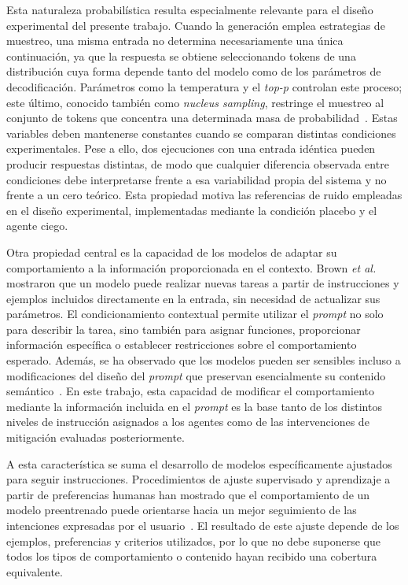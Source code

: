 Esta naturaleza probabilística resulta especialmente relevante para el diseño experimental del presente trabajo. Cuando la generación emplea estrategias de muestreo, una misma entrada no determina necesariamente una única continuación, ya que la respuesta se obtiene seleccionando tokens de una distribución cuya forma depende tanto del modelo como de los parámetros de decodificación. Parámetros como la temperatura y el \textit{top-p} controlan este proceso; este último, conocido también como \textit{nucleus sampling}, restringe el muestreo al conjunto de tokens que concentra una determinada masa de probabilidad~\cite{holtzman2019curious}. Estas variables deben mantenerse constantes cuando se comparan distintas condiciones experimentales. Pese a ello, dos ejecuciones con una entrada idéntica pueden producir respuestas distintas, de modo que cualquier diferencia observada entre condiciones debe interpretarse frente a esa variabilidad propia del sistema y no frente a un cero teórico. Esta propiedad motiva las referencias de ruido empleadas en el diseño experimental, implementadas mediante la condición placebo y el agente ciego.

Otra propiedad central es la capacidad de los modelos de adaptar su comportamiento a la información proporcionada en el contexto. Brown \textit{et al.}~\cite{brown2020language} mostraron que un modelo puede realizar nuevas tareas a partir de instrucciones y ejemplos incluidos directamente en la entrada, sin necesidad de actualizar sus parámetros. El condicionamiento contextual permite utilizar el \textit{prompt} no solo para describir la tarea, sino también para asignar funciones, proporcionar información específica o establecer restricciones sobre el comportamiento esperado. Además, se ha observado que los modelos pueden ser sensibles incluso a modificaciones del diseño del \textit{prompt} que preservan esencialmente su contenido semántico~\cite{sclar2024quantifying}. En este trabajo, esta capacidad de modificar el comportamiento mediante la información incluida en el \textit{prompt} es la base tanto de los distintos niveles de instrucción asignados a los agentes como de las intervenciones de mitigación evaluadas posteriormente.

A esta característica se suma el desarrollo de modelos específicamente ajustados para seguir instrucciones. Procedimientos de ajuste supervisado y aprendizaje a partir de preferencias humanas han mostrado que el comportamiento de un modelo preentrenado puede orientarse hacia un mejor seguimiento de las intenciones expresadas por el usuario~\cite{ouyang2022training}. El resultado de este ajuste depende de los ejemplos, preferencias y criterios utilizados, por lo que no debe suponerse que todos los tipos de comportamiento o contenido hayan recibido una cobertura equivalente.

